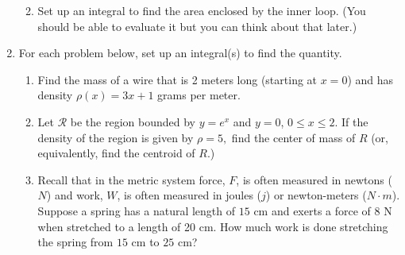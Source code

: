 \documentclass[11pt,fleqn]{article}
\begin{document}
\begin{enumerate}
\begin{enumerate}
  


  \item Set up an integral to find the area enclosed by the inner loop. (You should be able to evaluate it but you can think about that later.)
 
  \end{enumerate}
  
  \item  For each problem below, set up an integral(s) to find the quantity.
  	\begin{enumerate}
	\item Find the mass of a wire that is 2 meters long (starting at $x=0$) and has density $\rho(x)=3x+1$ grams per meter.
	\item Let $\mathcal{R}$ be the region bounded by $y = e^x$ and $y =
  0$, $0 \le x \le 2$. If the density of the region is given by $\rho=5,$ find the center of mass of $R$ (or, equivalently, find the centroid of $R.$)
  	\item Recall that in the metric system force, $F$, is often measured in newtons ($N$) and work, $W$, is often measured in joules ($j$) or newton-meters ($N\cdot m$). Suppose a spring has a natural length of $15$ cm and exerts a force of $8$ N when stretched to a length of 20 cm. How much work is done stretching the spring from $15$ cm to $25$ cm?
    	\end{enumerate}
 \end{enumerate}
\end{document}
